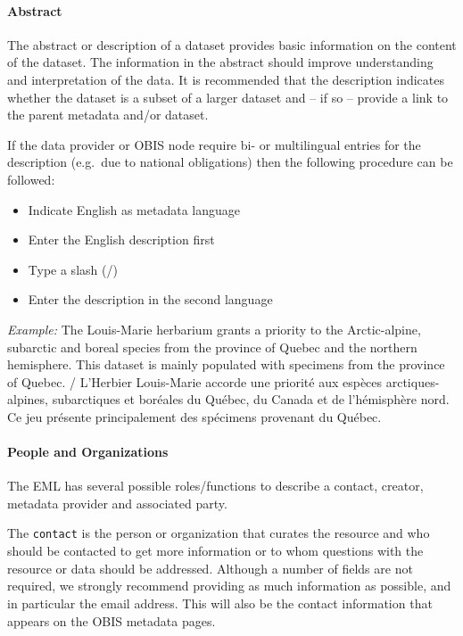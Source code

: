 \documentclass[
  letterpaper,
  DIV=11,
  numbers=noendperiod,
  oneside]{scrreprt}
\let\oldparagraph\paragraph
\renewcommand{\paragraph}[1]{\oldparagraph{#1}\mbox{}}
\providecommand{\tightlist}{%
  \setlength{\itemsep}{0pt}\setlength{\parskip}{0pt}}\usepackage{longtable,booktabs,array}
\begin{document}
\hypertarget{abstract}{%
\paragraph{Abstract}\label{abstract}}

The abstract or description of a dataset provides basic information on
the content of the dataset. The information in the abstract should
improve understanding and interpretation of the data. It is recommended
that the description indicates whether the dataset is a subset of a
larger dataset and -- if so -- provide a link to the parent metadata
and/or dataset.

If the data provider or OBIS node require bi- or multilingual entries
for the description (e.g.~due to national obligations) then the
following procedure can be followed:

\begin{itemize}
\tightlist
\item
  Indicate English as metadata language
\item
  Enter the English description first
\item
  Type a slash (/)
\item
  Enter the description in the second language
\end{itemize}

\emph{Example:} The Louis-Marie herbarium grants a priority to the
Arctic-alpine, subarctic and boreal species from the province of Quebec
and the northern hemisphere. This dataset is mainly populated with
specimens from the province of Quebec. / L'Herbier Louis-Marie accorde
une priorité aux espèces arctiques-alpines, subarctiques et boréales du
Québec, du Canada et de l'hémisphère nord. Ce jeu présente
principalement des spécimens provenant du Québec.

\hypertarget{people-and-organizations}{%
\paragraph{People and Organizations}\label{people-and-organizations}}

The EML has several possible roles/functions to describe a contact,
creator, metadata provider and associated party.

The \texttt{contact} is the person or organization that curates the
resource and who should be contacted to get more information or to whom
questions with the resource or data should be addressed. Although a
number of fields are not required, we strongly recommend providing as
much information as possible, and in particular the email address. This
will also be the contact information that appears on the OBIS metadata
pages.
\end{document}
